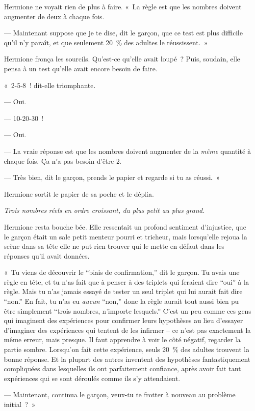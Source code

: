 Hermione ne voyait rien de plus à faire.
«~La règle est que les nombres doivent augmenter de deux à chaque fois.

--- Maintenant suppose que je te dise, dit le garçon, que ce test est plus difficile qu'il n'y paraît, et que seulement 20~\% des adultes le réussissent.~»

Hermione fronça les sourcils. Qu'est-ce qu'elle avait loupé~?
Puis, soudain, elle pensa à un test qu'elle avait encore besoin de faire.

«~2-5-8~! dit-elle triomphante.

--- Oui.

--- 10-20-30~!

--- Oui.

--- La vraie réponse est que les nombres doivent augmenter de la \emph{même} quantité à chaque fois. Ça n'a pas besoin d'être 2.

--- Très bien, dit le garçon, prends le papier et regarde si tu as réussi.~»

Hermione sortit le papier de sa poche et le déplia.

\emph{Trois nombres réels en ordre croissant, du plus petit au plus grand.}

Hermione resta bouche bée.
Elle ressentait un profond sentiment d'injustice, que le garçon était un sale petit menteur pourri et tricheur, mais lorsqu'elle rejoua la scène dans sa tête elle ne put rien trouver qui le mette en défaut dans les réponses qu'il avait données.

«~Tu viens de découvrir le “biais de confirmation,” dit le garçon.
Tu avais une règle en tête, et tu n'as fait que à penser à des triplets qui feraient dire “oui” à la règle.
Mais tu n'as jamais essayé de tester un seul triplet qui lui aurait fait dire “non.”
En fait, tu n'as eu \emph{aucun} “non,” donc la règle aurait tout aussi bien pu être simplement “trois nombres, n'importe lesquels.”
C'est un peu comme ces gens qui imaginent des expériences pour confirmer leurs hypothèses au lieu d'essayer d'imaginer des expériences qui tentent de les infirmer -- ce n'est pas exactement la même erreur, mais presque.
Il faut apprendre à voir le côté négatif, regarder la partie sombre.
Lorsqu'on fait cette expérience, seuls 20~\% des adultes trouvent la bonne réponse.
Et la plupart des autres inventent des hypothèses fantastiquement compliquées dans lesquelles ils ont parfaitement confiance, après avoir fait tant expériences qui se sont déroulés comme ils s'y attendaient.

--- Maintenant, continua le garçon, veux-tu te frotter à nouveau au problème initial~?~»

